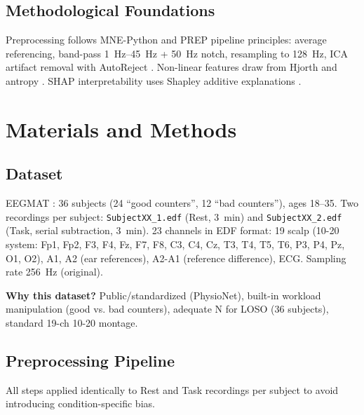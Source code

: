 \documentclass[conference]{IEEEtran}
\begin{document}
\subsection{Methodological Foundations}
Preprocessing follows MNE-Python \cite{gramfort2013meg} and PREP pipeline \cite{bigdely2015prep} principles: average referencing, band-pass \SIrange{1}{45}{\hertz} + \SI{50}{\hertz} notch, resampling to \SI{128}{\hertz}, ICA artifact removal \cite{makeig1997independent} with AutoReject \cite{jas2017autoreject}. Non-linear features draw from Hjorth \cite{hjorth1970eeg} and antropy \cite{antropy}. SHAP interpretability uses Shapley additive explanations \cite{lundberg2017unified}.

\section{Materials and Methods}

\subsection{Dataset}
\label{sec:dataset}
EEGMAT \cite{zyma2019electroencephalograms}: 36 subjects (24 ``good counters'', 12 ``bad counters''), ages \SIrange{18}{35}{\year}. Two recordings per subject: \texttt{SubjectXX\_1.edf} (Rest, \texttildelow\SI{3}{\minute}) and \texttt{SubjectXX\_2.edf} (Task, serial subtraction, \texttildelow\SI{3}{\minute}). \num{23} channels in EDF format: \num{19} scalp (10-20 system: Fp1, Fp2, F3, F4, Fz, F7, F8, C3, C4, Cz, T3, T4, T5, T6, P3, P4, Pz, O1, O2), A1, A2 (ear references), A2-A1 (reference difference), ECG. Sampling rate \SI{256}{\hertz} (original).

\textbf{Why this dataset?} Public/standardized (PhysioNet), built-in workload manipulation (good vs. bad counters), adequate N for LOSO (36 subjects), standard 19-ch 10-20 montage.

\subsection{Preprocessing Pipeline}
\label{sec:preprocess}
All steps applied identically to Rest and Task recordings per subject to avoid introducing condition-specific bias.
\end{document}
